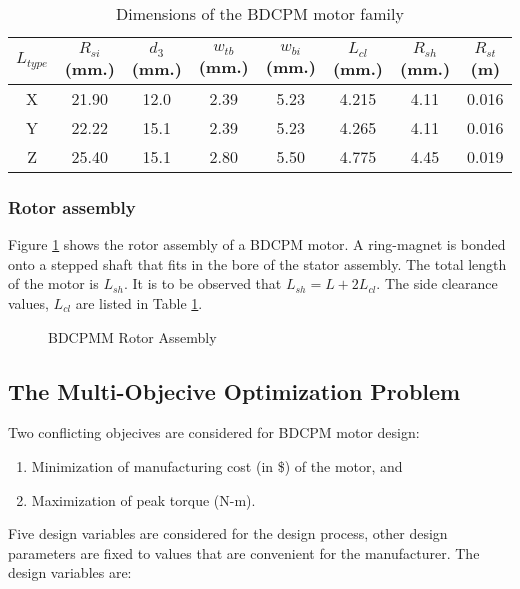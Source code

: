 \begin{table}[!ht]
\centering
\begin{tabular}{|c|c|c|c|c|c|c|c|}
 \hline
 $L_{type}$ & $R_{si}$ (mm.) & $d_3$ (mm.) & $w_{tb}$ (mm.) & $w_{bi}$ (mm.) & $L_{cl}$ (mm.)& $R_{sh}$ (mm.) & $R_{st}$ (m) \\
 \hline
 X & 21.90 & 12.0 & 2.39 & 5.23 & 4.215 & 4.11 & 0.016 \\
 \hline
 Y & 22.22 & 15.1 & 2.39 & 5.23 & 4.265 & 4.11 & 0.016 \\
 \hline
 Z & 25.40 & 15.1 & 2.80 & 5.50 & 4.775 & 4.45 & 0.019 \\
 \hline
 \end{tabular}
\caption{Dimensions of the BDCPM motor family}
\label{ltypeDimTable}
\end{table}




\subsubsection{Rotor assembly}

Figure \ref{bdcpmRotor} shows the rotor assembly of a BDCPM motor. A
ring-magnet is bonded onto a stepped shaft that fits in the bore of
the stator assembly. The total length of the motor is $L_{sh}$. It is 
to be observed that $ L_{sh} = L + 2L_{cl}$. The side clearance 
values, $L_{cl}$ are listed in Table \ref{ltypeDimTable}.


\begin{figure}[ht]\begin{center}
 \caption{BDCPMM Rotor Assembly}
 \label{bdcpmRotor}
\end{center}\end{figure}

\subsection{The Multi-Objecive Optimization Problem}
Two conflicting objecives are considered for BDCPM motor design:

\begin{enumerate}
\item Minimization of manufacturing cost (in \$) of the motor, and
\item Maximization of peak torque (N-m).
\end{enumerate}

Five design variables are considered for the design process, other 
design parameters are fixed to values that are convenient for the 
manufacturer. The design variables are:

